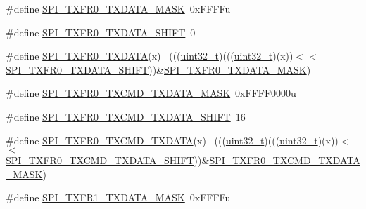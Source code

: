 \begin{DoxyCompactItemize}
\item 
\#define \hyperlink{group___s_p_i___register___masks_ga9a231481c0385058731013344776a9f1}{S\+P\+I\+\_\+\+T\+X\+F\+R0\+\_\+\+T\+X\+D\+A\+T\+A\+\_\+\+M\+A\+SK}~0x\+F\+F\+F\+Fu
\item 
\#define \hyperlink{group___s_p_i___register___masks_ga8f072c39e4ee2cddff2444298fc92be0}{S\+P\+I\+\_\+\+T\+X\+F\+R0\+\_\+\+T\+X\+D\+A\+T\+A\+\_\+\+S\+H\+I\+FT}~0
\item 
\#define \hyperlink{group___s_p_i___register___masks_gadc339b99a4f296761878521036b785df}{S\+P\+I\+\_\+\+T\+X\+F\+R0\+\_\+\+T\+X\+D\+A\+TA}(x)                                        ~(((\hyperlink{_p_e___types_8h_a33594304e786b158f3fb30289278f5af}{uint32\+\_\+t})(((\hyperlink{_p_e___types_8h_a33594304e786b158f3fb30289278f5af}{uint32\+\_\+t})(x))$<$$<$\hyperlink{group___s_p_i___register___masks_ga8f072c39e4ee2cddff2444298fc92be0}{S\+P\+I\+\_\+\+T\+X\+F\+R0\+\_\+\+T\+X\+D\+A\+T\+A\+\_\+\+S\+H\+I\+FT}))\&\hyperlink{group___s_p_i___register___masks_ga9a231481c0385058731013344776a9f1}{S\+P\+I\+\_\+\+T\+X\+F\+R0\+\_\+\+T\+X\+D\+A\+T\+A\+\_\+\+M\+A\+SK})
\item 
\#define \hyperlink{group___s_p_i___register___masks_ga2d7e46a45e284b2a837f0dfa4103c9cc}{S\+P\+I\+\_\+\+T\+X\+F\+R0\+\_\+\+T\+X\+C\+M\+D\+\_\+\+T\+X\+D\+A\+T\+A\+\_\+\+M\+A\+SK}~0x\+F\+F\+F\+F0000u
\item 
\#define \hyperlink{group___s_p_i___register___masks_gad5b1e75e9410e41d3c81384798040284}{S\+P\+I\+\_\+\+T\+X\+F\+R0\+\_\+\+T\+X\+C\+M\+D\+\_\+\+T\+X\+D\+A\+T\+A\+\_\+\+S\+H\+I\+FT}~16
\item 
\#define \hyperlink{group___s_p_i___register___masks_ga7c7be145ccd1decbb6a6e5d60b8e43e5}{S\+P\+I\+\_\+\+T\+X\+F\+R0\+\_\+\+T\+X\+C\+M\+D\+\_\+\+T\+X\+D\+A\+TA}(x)                            ~(((\hyperlink{_p_e___types_8h_a33594304e786b158f3fb30289278f5af}{uint32\+\_\+t})(((\hyperlink{_p_e___types_8h_a33594304e786b158f3fb30289278f5af}{uint32\+\_\+t})(x))$<$$<$\hyperlink{group___s_p_i___register___masks_gad5b1e75e9410e41d3c81384798040284}{S\+P\+I\+\_\+\+T\+X\+F\+R0\+\_\+\+T\+X\+C\+M\+D\+\_\+\+T\+X\+D\+A\+T\+A\+\_\+\+S\+H\+I\+FT}))\&\hyperlink{group___s_p_i___register___masks_ga2d7e46a45e284b2a837f0dfa4103c9cc}{S\+P\+I\+\_\+\+T\+X\+F\+R0\+\_\+\+T\+X\+C\+M\+D\+\_\+\+T\+X\+D\+A\+T\+A\+\_\+\+M\+A\+SK})
\item 
\#define \hyperlink{group___s_p_i___register___masks_ga1264b5c9bd3d50782925741457405b2d}{S\+P\+I\+\_\+\+T\+X\+F\+R1\+\_\+\+T\+X\+D\+A\+T\+A\+\_\+\+M\+A\+SK}~0x\+F\+F\+F\+Fu
\item 

\end{DoxyCompactItemize}
